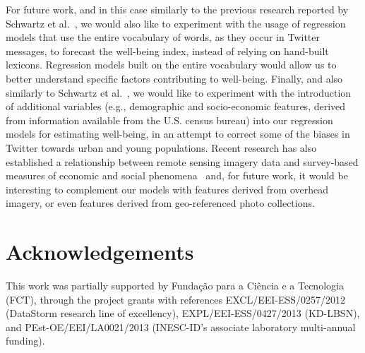 \documentclass{acm_proc_article-sp}
\begin{document}
For future work, and in this case similarly to the previous research reported by Schwartz et al.~\cite{Schwartz:2013:Tweets}, we would also like to experiment with the usage of regression models that use the entire vocabulary of words, as they occur in Twitter messages, to forecast the well-being index, instead of relying on hand-built lexicons. Regression models built on the entire vocabulary would allow us to better understand specific factors contributing to well-being. Finally, and also similarly to Schwartz et al.~\cite{Schwartz:2013:Tweets}, we would like to experiment with the introduction of additional variables (e.g., demographic and socio-economic features, derived from information available from the U.S. census bureau) into our regression models for estimating well-being, in an attempt to correct some of the biases in Twitter towards urban and young populations. Recent research has also established a relationship between remote sensing imagery data and survey-based measures of economic and social phenomena~\cite{Regan2012} and, for future work, it would be interesting to complement our models with features derived from overhead imagery, or even features derived from geo-referenced photo collections.

\section*{Acknowledgements}

This work was partially supported by Fundação para a Ciência e a Tecnologia (FCT), through the project grants with references EXCL/EEI-ESS/0257/2012 (DataStorm research line of excellency), EXPL/EEI-ESS/0427/2013 (KD-LBSN), and PEst-OE/EEI/LA0021/2013 (INESC-ID's associate laboratory multi-annual funding). 


\small

\end{document}
